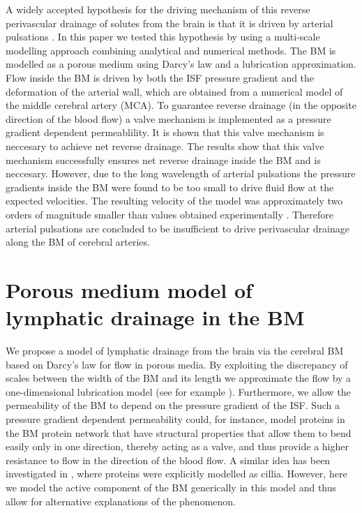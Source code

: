 \documentclass[a4paper,titlepage]{scrartcl}
\begin{document}
A widely accepted hypothesis for the driving mechanism of this reverse perivascular drainage of solutes from the brain is that it is driven by arterial pulsations \cite{Weller2009,Carare2008,Hawkes2011,Morris2014,Schley2006,Attems2011,Wang2011,Iliff2012,Asgari2015,Sharp2015,Weller2015a}. In this paper we tested this hypothesis by using a multi-scale modelling approach combining analytical and numerical methods. The BM is modelled as a porous medium using Darcy's law and a lubrication approximation. Flow inside the BM is driven by both the ISF pressure gradient and the deformation of the arterial wall, which are obtained from a numerical model of the middle cerebral artery (MCA). To guarantee reverse drainage (\ie in the opposite direction of the blood flow) a valve mechanism is implemented as a pressure gradient dependent permeablility. It is shown that this valve mechanism is neccesary to achieve net reverse drainage. The results show that this valve mechanism successfully ensures net reverse drainage inside the BM and is neccesary. However, due to the long wavelength of arterial pulsations the pressure gradients inside the BM were found to be too small to drive fluid flow at the expected velocities. The resulting velocity of the model was approximately two orders of magnitude smaller than values obtained experimentally \cite{Carare2008}. Therefore arterial pulsations are concluded to be insufficient to drive perivascular drainage along the BM of cerebral arteries.


\section{Porous medium model of lymphatic drainage in the BM}
\label{sec:diodemodel}

We propose a model of lymphatic drainage from the brain via the cerebral BM based on Darcy's law for flow in porous media. By exploiting the discrepancy of scales between the width of the BM and its length we approximate the flow by a one-dimensional lubrication model (see for example \cite{Ockendon1995}). Furthermore, we allow the permeability of the BM to depend on the pressure gradient of the ISF. Such a pressure gradient dependent permeability could, for instance, model proteins in the BM protein network that have structural properties that allow them to bend easily only in one direction, thereby acting as a valve, and thus provide a higher resistance to flow in the direction of the blood flow. A similar idea has been investigated in \cite{Sharp2015}, where proteins were explicitly modelled as cillia. However, here we model the active component of the BM generically in this model and thus allow for alternative explanations of the phenomenon.
\end{document}

